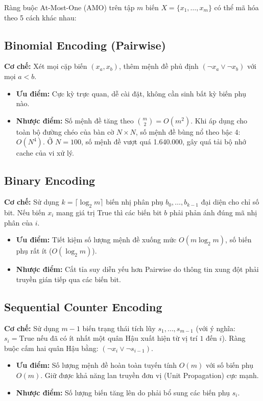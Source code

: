 \documentclass[a4paper,11pt]{article}
\begin{document}
Ràng buộc At-Most-One (AMO) trên tập $m$ biến $X = \{x_1, \dots, x_m\}$ có thể mã hóa theo 5 cách khác nhau:

\subsection{Binomial Encoding (Pairwise)}
\textbf{Cơ chế:} Xét mọi cặp biến $(x_a, x_b)$, thêm mệnh đề phủ định $(\neg x_a \lor \neg x_b)$ với mọi $a < b$.
\begin{itemize}
    \item \textbf{Ưu điểm:} Cực kỳ trực quan, dễ cài đặt, không cần sinh bất kỳ biến phụ nào.
    \item \textbf{Nhược điểm:} Số mệnh đề tăng theo $\binom{m}{2} = O(m^2)$. Khi áp dụng cho toàn bộ đường chéo của bàn cờ $N \times N$, số mệnh đề bùng nổ theo bậc 4: $O(N^4)$. Ở $N=100$, số mệnh đề vượt quá 1.640.000, gây quá tải bộ nhớ cache của vi xử lý.
\end{itemize}

\subsection{Binary Encoding}
\textbf{Cơ chế:} Sử dụng $k = \lceil \log_2 m \rceil$ biến nhị phân phụ $b_0, \dots, b_{k-1}$ đại diện cho chỉ số bit. Nếu biến $x_i$ mang giá trị True thì các biến bit $b$ phải phản ánh đúng mã nhị phân của $i$.
\begin{itemize}
    \item \textbf{Ưu điểm:} Tiết kiệm số lượng mệnh đề xuống mức $O(m \log_2 m)$, số biến phụ rất ít ($O(\log_2 m)$).
    \item \textbf{Nhược điểm:} Cắt tỉa suy diễn yếu hơn Pairwise do thông tin xung đột phải truyền gián tiếp qua các biến bit.
\end{itemize}

\subsection{Sequential Counter Encoding}
\textbf{Cơ chế:} Sử dụng $m-1$ biến trạng thái tích lũy $s_1, \dots, s_{m-1}$ (với ý nghĩa: $s_i = \text{True}$ nếu đã có ít nhất một quân Hậu xuất hiện từ vị trí $1$ đến $i$). Ràng buộc cấm hai quân Hậu bằng: $(\neg x_i \lor \neg s_{i-1})$.
\begin{itemize}
    \item \textbf{Ưu điểm:} Số lượng mệnh đề hoàn toàn tuyến tính $O(m)$ với số biến phụ $O(m)$. Giữ được khả năng lan truyền đơn vị (Unit Propagation) cực mạnh.
    \item \textbf{Nhược điểm:} Số lượng biến tăng lên do phải bổ sung các biến phụ $s_i$.
\end{itemize}
\end{document}
